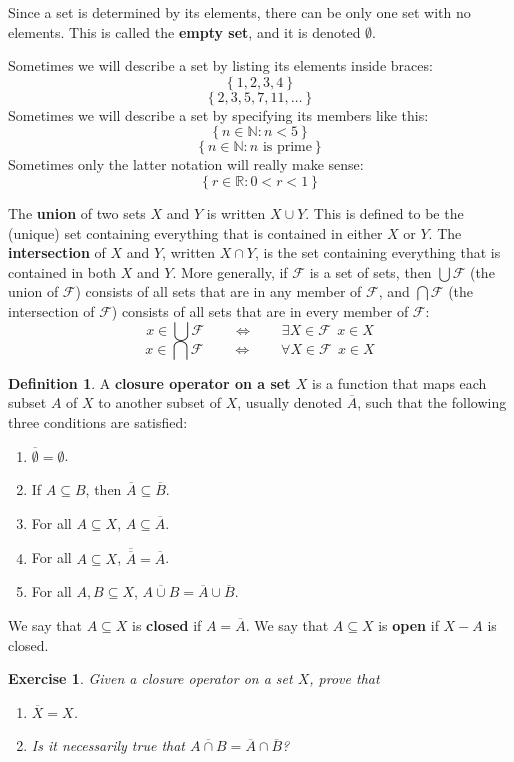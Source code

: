 \documentclass[12pt]{amsart}
\newtheorem{exercise}{Exercise}[section]
\theoremstyle{definition}
\newtheorem{definition}[theorem]{Definition}
\theoremstyle{remark}
\newcommand{\R}{\mathbb{R}}
\newcommand{\N}{\mathbb{N}}
\newcommand{\explicitSet}[1]{\left\lbrace #1 \right\rbrace}
\newcommand{\set}[2]{\explicitSet{#1 \colon #2}}
\newcommand{\0}{\emptyset}
\newcommand{\closure}[1]{\overline{#1}}
\newcommand{\F}{\mathcal F}
\begin{document}
Since a set is determined by its elements, there can be only one set with no elements. This is called the \textbf{empty set}, and it is denoted $\0$.

Sometimes we will describe a set by listing its elements inside braces:
$$\explicitSet{1,2,3,4}$$
$$\explicitSet{2,3,5,7,11,\dots}$$
Sometimes we will describe a set by specifying its members like this:
$$\set{n \in \N}{n < 5}$$
$$\set{n \in \N}{n \text{ is prime}}$$
Sometimes only the latter notation will really make sense:
$$\set{r \in \R}{0 < r < 1}$$

The \textbf{union} of two sets $X$ and $Y$ is written $X \cup Y$. This is defined to be the (unique) set containing everything that is contained in either $X$ or $Y$. The \textbf{intersection} of $X$ and $Y$, written $X \cap Y$, is the set containing everything that is contained in both $X$ and $Y$. More generally, if $\F$ is a set of sets, then $\bigcup \F$ (the union of $\F$) consists of all sets that are in any member of $\F$, and $\bigcap \F$ (the intersection of $\F$) consists of all sets that are in every member of $\F$:
$$x \in \bigcup \F \qquad \Leftrightarrow \qquad \exists X \in \F \ \ x \in X$$
$$x \in \bigcap \F \qquad \Leftrightarrow \qquad \forall X \in \F \ \ x \in X$$

\begin{definition}
A \textbf{closure operator on a set $X$} is a function that maps each subset $A$ of $X$ to another subset of $X$, usually denoted $\closure{A}$, such that the following three conditions are satisfied:
\begin{enumerate}
\item $\closure{\0} = \0$.
\item If $A \subseteq B$, then $\closure{A} \subseteq \closure{B}$.
\item For all $A \subseteq X$, $A \subseteq \closure{A}$.
\item For all $A \subseteq X$, $\closure{\closure{A}} = \closure{A}$.
\item For all $A,B \subseteq X$, $\closure{A \cup B} = \closure{A} \cup \closure{B}$.
\end{enumerate} 
We say that $A \subseteq X$ is \textbf{closed} if $A = \closure{A}$. We say that $A \subseteq X$ is \textbf{open} if $X-A$ is closed.
\end{definition}

\begin{exercise}
Given a closure operator on a set $X$, prove that
\begin{enumerate}
\item $\closure{X} = X$.
\item Is it necessarily true that $\closure{A \cap B} = \closure{A} \cap \closure{B}$?
\end{enumerate}
\end{exercise}
\end{document}
